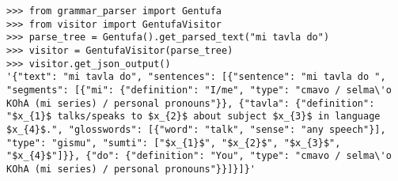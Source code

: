 \newpage

\begin{lstlisting}[caption=GentufaVisitor class being used by a Python script]
>>> from grammar_parser import Gentufa
>>> from visitor import GentufaVisitor
>>> parse_tree = Gentufa().get_parsed_text("mi tavla do")
>>> visitor = GentufaVisitor(parse_tree)
>>> visitor.get_json_output()
'{"text": "mi tavla do", "sentences": [{"sentence": "mi tavla do ", "segments": [{"mi": {"definition": "I/me", "type": "cmavo / selma\'o KOhA (mi series) / personal pronouns"}}, {"tavla": {"definition": "$x_{1}$ talks/speaks to $x_{2}$ about subject $x_{3}$ in language $x_{4}$.", "glosswords": [{"word": "talk", "sense": "any speech"}], "type": "gismu", "sumti": ["$x_{1}$", "$x_{2}$", "$x_{3}$", "$x_{4}$"]}}, {"do": {"definition": "You", "type": "cmavo / selma\'o KOhA (mi series) / personal pronouns"}}]}]}'
\end{lstlisting}